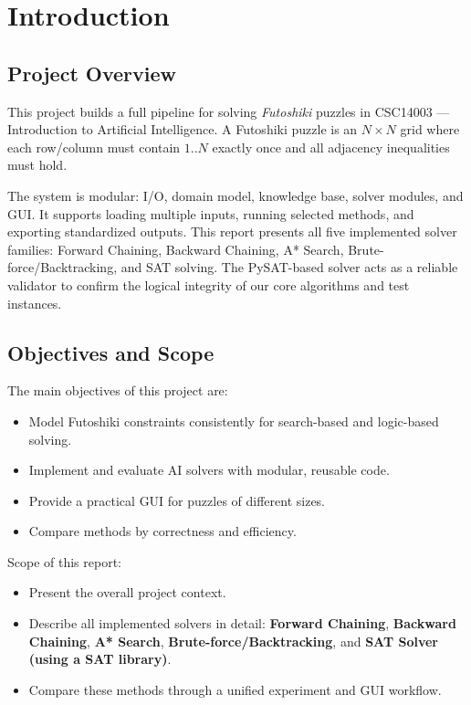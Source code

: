 \documentclass[12pt, a4paper]{article}
\begin{document}
\pagestyle{empty}

\clearpage

\tableofcontents
\newpage
\listoftables
\newpage
\listoffigures
\clearpage
{}
\setcounter{page}{1}
\pagestyle{fancy}

\section{Introduction}
\subsection{Project Overview}
This project builds a full pipeline for solving \textit{Futoshiki} puzzles in CSC14003 --- Introduction to Artificial Intelligence. A Futoshiki puzzle is an \(N \times N\) grid where each row/column must contain \(1..N\) exactly once and all adjacency inequalities must hold.

The system is modular: I/O, domain model, knowledge base, solver modules, and GUI. It supports loading multiple inputs, running selected methods, and exporting standardized outputs. This report presents all five implemented solver families: Forward Chaining, Backward Chaining, A* Search, Brute-force/Backtracking, and SAT solving. The PySAT-based solver acts as a reliable validator to confirm the logical integrity of our core algorithms and test instances.

\subsection{Objectives and Scope}
The main objectives of this project are:
\begin{itemize}
	\item Model Futoshiki constraints consistently for search-based and logic-based solving.
	\item Implement and evaluate AI solvers with modular, reusable code.
	\item Provide a practical GUI for puzzles of different sizes.
	\item Compare methods by correctness and efficiency.
\end{itemize}

Scope of this report:
\begin{itemize}
	\item Present the overall project context.
	\item Describe all implemented solvers in detail: \textbf{Forward Chaining}, \textbf{Backward Chaining}, \textbf{A* Search}, \textbf{Brute-force/Backtracking}, and \textbf{SAT Solver (using a SAT library)}.
	\item Compare these methods through a unified experiment and GUI workflow.
\end{itemize}
\end{document}
